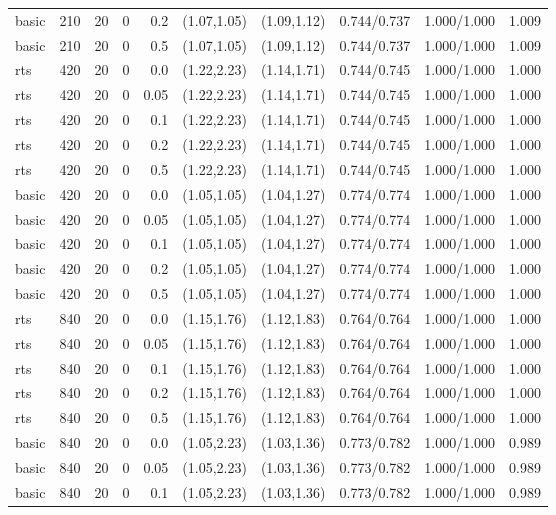 \begin{tabular}{llrrrccccc}
basic & 210 & 20 & 0 & 0.2 & (1.07,1.05) & (1.09,1.12) & 0.744/0.737 & 1.000/1.000 & 1.009 \\
basic & 210 & 20 & 0 & 0.5 & (1.07,1.05) & (1.09,1.12) & 0.744/0.737 & 1.000/1.000 & 1.009 \\
rts & 420 & 20 & 0 & 0.0 & (1.22,2.23) & (1.14,1.71) & 0.744/0.745 & 1.000/1.000 & 1.000 \\
rts & 420 & 20 & 0 & 0.05 & (1.22,2.23) & (1.14,1.71) & 0.744/0.745 & 1.000/1.000 & 1.000 \\
rts & 420 & 20 & 0 & 0.1 & (1.22,2.23) & (1.14,1.71) & 0.744/0.745 & 1.000/1.000 & 1.000 \\
rts & 420 & 20 & 0 & 0.2 & (1.22,2.23) & (1.14,1.71) & 0.744/0.745 & 1.000/1.000 & 1.000 \\
rts & 420 & 20 & 0 & 0.5 & (1.22,2.23) & (1.14,1.71) & 0.744/0.745 & 1.000/1.000 & 1.000 \\
basic & 420 & 20 & 0 & 0.0 & (1.05,1.05) & (1.04,1.27) & 0.774/0.774 & 1.000/1.000 & 1.000 \\
basic & 420 & 20 & 0 & 0.05 & (1.05,1.05) & (1.04,1.27) & 0.774/0.774 & 1.000/1.000 & 1.000 \\
basic & 420 & 20 & 0 & 0.1 & (1.05,1.05) & (1.04,1.27) & 0.774/0.774 & 1.000/1.000 & 1.000 \\
basic & 420 & 20 & 0 & 0.2 & (1.05,1.05) & (1.04,1.27) & 0.774/0.774 & 1.000/1.000 & 1.000 \\
basic & 420 & 20 & 0 & 0.5 & (1.05,1.05) & (1.04,1.27) & 0.774/0.774 & 1.000/1.000 & 1.000 \\
rts & 840 & 20 & 0 & 0.0 & (1.15,1.76) & (1.12,1.83) & 0.764/0.764 & 1.000/1.000 & 1.000 \\
rts & 840 & 20 & 0 & 0.05 & (1.15,1.76) & (1.12,1.83) & 0.764/0.764 & 1.000/1.000 & 1.000 \\
rts & 840 & 20 & 0 & 0.1 & (1.15,1.76) & (1.12,1.83) & 0.764/0.764 & 1.000/1.000 & 1.000 \\
rts & 840 & 20 & 0 & 0.2 & (1.15,1.76) & (1.12,1.83) & 0.764/0.764 & 1.000/1.000 & 1.000 \\
rts & 840 & 20 & 0 & 0.5 & (1.15,1.76) & (1.12,1.83) & 0.764/0.764 & 1.000/1.000 & 1.000 \\
basic & 840 & 20 & 0 & 0.0 & (1.05,2.23) & (1.03,1.36) & 0.773/0.782 & 1.000/1.000 & 0.989 \\
basic & 840 & 20 & 0 & 0.05 & (1.05,2.23) & (1.03,1.36) & 0.773/0.782 & 1.000/1.000 & 0.989 \\
basic & 840 & 20 & 0 & 0.1 & (1.05,2.23) & (1.03,1.36) & 0.773/0.782 & 1.000/1.000 & 0.989 \\

\end{tabular}
